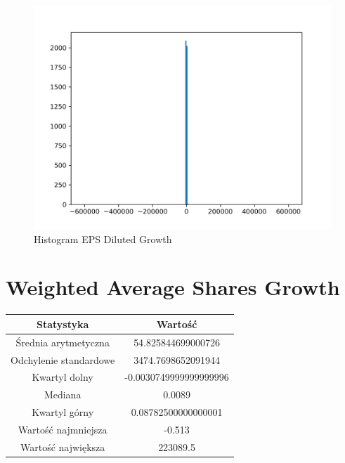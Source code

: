 \documentclass{article}
\begin{document}
\begin{figure}[h!]
    \includegraphics[width=\linewidth]{variables/EPS Diluted Growth.png}
    \caption{Histogram EPS Diluted Growth }
\end{figure}\section{ Weighted Average Shares Growth }

\begin{center}
    \begin{tabular}{|c | c|} 
    \hline
    Statystyka & Wartość \\
    \hline\hline
    Średnia arytmetyczna & 54.825844699000726 \\ 
    \hline
    Odchylenie standardowe & 3474.7698652091944 \\
    \hline
    Kwartyl dolny & -0.0030749999999999996 \\
    \hline
    Mediana & 0.0089 \\
    \hline
    Kwartyl górny & 0.08782500000000001 \\
    \hline
    Wartość najmniejsza & -0.513 \\
    \hline
    Wartość największa & 223089.5 \\
    \hline
   \end{tabular}
\end{center}
\end{document}
